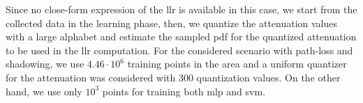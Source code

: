 \documentclass[draftcls,onecolumn,12pt]{IEEEtran}
\begin{document}

Since no close-form expression of the \ac{llr} is available in this case, we start from the collected data in the learning phase, then, we quantize the attenuation values with a large alphabet and estimate the sampled \ac{pdf} for the quantized attenuation to be used in the \ac{llr} computation. For the considered scenario with path-loss and shadowing, we use $4.46 \cdot 10^6$ training points in the area and a uniform quantizer for the attenuation was considered with $300$ quantization values. On the other hand, we use only $10^3$ points for training both \ac{mlp} and \ac{svm}. 
\end{document}
